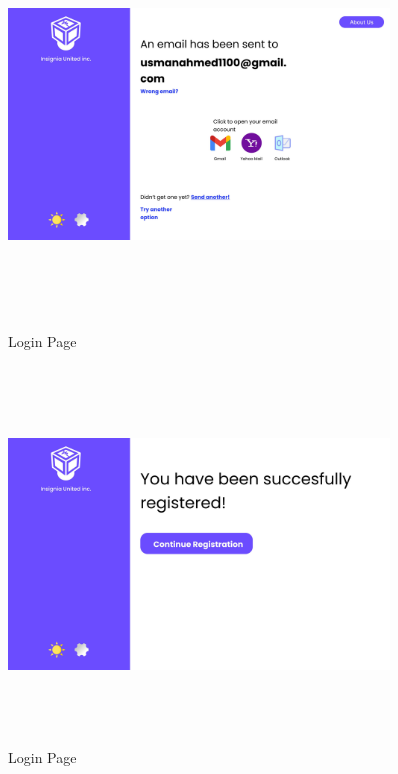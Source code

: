 \begin{figure}[H]
\includegraphics[height=10cm, width=0.9\textwidth]{./images/prototype/0007}
\centering 
\caption{Login Page}
\label{fig:prototype1}

\includegraphics[height=10cm, width=0.9\textwidth]{./images/prototype/0008}
\centering 
\caption{Login Page}
\label{fig:prototype1}
\end{figure}

